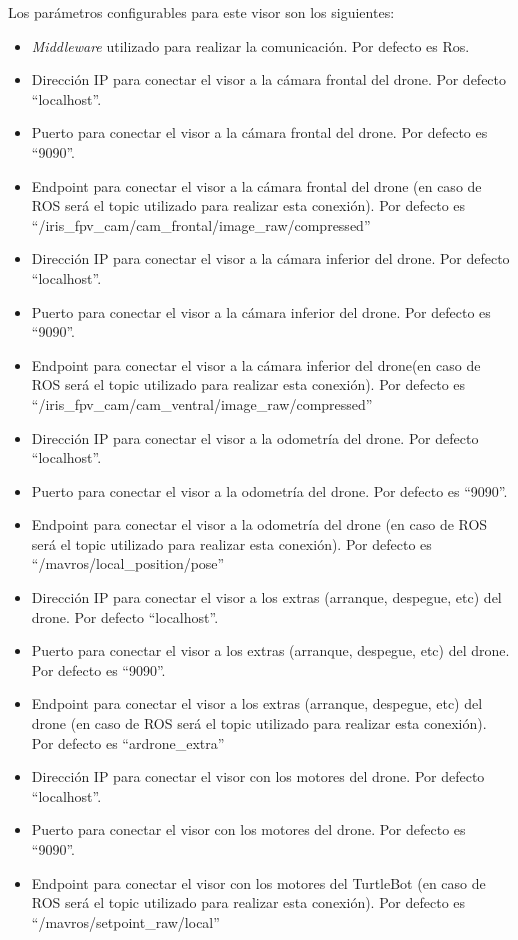 Los parámetros configurables para este visor son los siguientes:
\begin{itemize}
\item \textit{Middleware} utilizado para realizar la comunicación. Por defecto es Ros.
\item Dirección IP para conectar el visor a la cámara frontal del drone. Por defecto ``localhost''.
\item Puerto para conectar el visor a la cámara frontal del drone. Por defecto es ``9090''.
\item Endpoint para conectar el visor a la cámara frontal del drone (en caso de ROS será el topic utilizado para realizar esta conexión). Por defecto es\\``/iris\_fpv\_cam/cam\_frontal/image\_raw/compressed''
\item Dirección IP para conectar el visor a la cámara inferior del drone. Por defecto ``localhost''.
\item Puerto para conectar el visor a la cámara inferior del drone. Por defecto es ``9090''.
\item Endpoint para conectar el visor a la cámara inferior del drone(en caso de ROS será el topic utilizado para realizar esta conexión). Por defecto es\\``/iris\_fpv\_cam/cam\_ventral/image\_raw/compressed''
\item Dirección IP para conectar el visor a la odometría del drone. Por defecto ``localhost''.
\item Puerto para conectar el visor a la odometría del drone. Por defecto es ``9090''.
\item Endpoint para conectar el visor a la odometría del drone (en caso de ROS será el topic utilizado para realizar esta conexión). Por defecto es ``/mavros/local\_position/pose''
\item Dirección IP para conectar el visor a los extras (arranque, despegue, etc) del drone. Por defecto ``localhost''.
\item Puerto para conectar el visor  a los extras (arranque, despegue, etc) del drone. Por defecto es ``9090''.
\item Endpoint para conectar el visor  a los extras (arranque, despegue, etc) del drone (en caso de ROS será el topic utilizado para realizar esta conexión). Por defecto es ``ardrone\_extra''
\item Dirección IP para conectar el visor con los motores del drone. Por defecto ``localhost''.
\item Puerto para conectar el visor con los motores del drone. Por defecto es ``9090''.
\item Endpoint para conectar el visor con los motores del TurtleBot (en caso de ROS será el topic utilizado para realizar esta conexión). Por defecto es\\ ``/mavros/setpoint\_raw/local''
\end{itemize}

